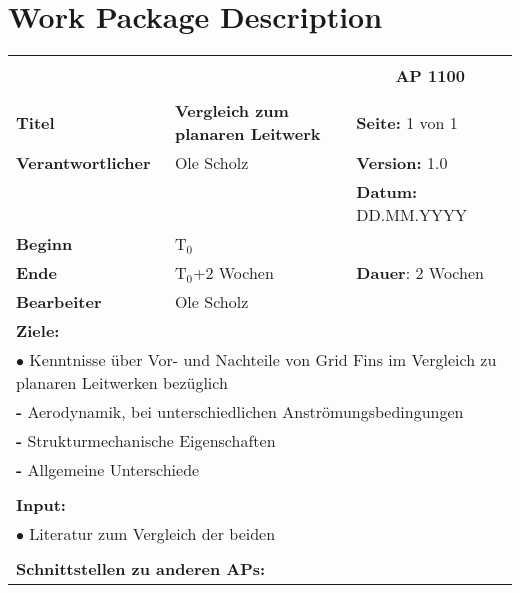 \section{Work Package Description}
\label{sec:wpd}
\begin{table}[!h]
	\begin{center}
		\begin{tabular}{|p{35mm}||p{55mm}|p{50mm}||p{40mm}|}
			\hline
			\multicolumn{3}{|l||}{\textbf{}} & \multicolumn{1}{c|}{}\\
			\multicolumn{3}{|l||}{\textbf{}} & \multicolumn{1}{c|}{\textbf{AP 1100}}\\
			\multicolumn{3}{|l||}{\textbf{}} & \multicolumn{1}{c|}{}\\
			\hline\hline
			\textbf{Titel} & \multicolumn{2}{p{7cm}||}{\textbf{Vergleich zum planaren Leitwerk}} 
			& \textbf{Seite:} 1 von 1\\
			\hline
			\textbf{Verantwortlicher} & \multicolumn{2}{l||}{Ole Scholz} & \textbf{Version:} 1.0\\
			\hline
			\multicolumn{3}{|l||}{} & \textbf{Datum:} DD.MM.YYYY\\
			\hline\hline
			\textbf{Beginn} & \multicolumn{2}{l||}{T$_0$} & \\
			\hline
			\textbf{Ende} & \multicolumn{2}{l||}{T$_0$+2 Wochen} & \textbf{Dauer}: 2 Wochen\\
			\hline\hline
			\textbf{Bearbeiter} & \multicolumn{3}{l|}{Ole Scholz}\\
			\hline\hline
			\multicolumn{4}{|p{150mm}|}{\textbf{Ziele:}}\\
			\multicolumn{4}{|p{150mm}|}{$\bullet$ Kenntnisse über Vor- und Nachteile von Grid Fins im Vergleich zu planaren Leitwerken bezüglich}\\
			\multicolumn{4}{|p{150mm}|}{\qquad \textbf{-} Aerodynamik, bei unterschiedlichen Anströmungsbedingungen}\\
			\multicolumn{4}{|p{150mm}|}{\qquad \textbf{-} Strukturmechanische Eigenschaften}\\
			\multicolumn{4}{|p{150mm}|}{\qquad \textbf{-} Allgemeine Unterschiede}\\
			\multicolumn{4}{|p{150mm}|}{}\\
			\multicolumn{4}{|p{150mm}|}{\textbf{Input:}}\\
			\multicolumn{4}{|p{150mm}|}{$\bullet$ Literatur zum Vergleich der beiden}\\
			\multicolumn{4}{|p{150mm}|}{}\\
			\multicolumn{4}{|p{150mm}|}{\textbf{Schnittstellen zu anderen APs:}}\\

\end{tabular}
\end{center}
\end{table}
